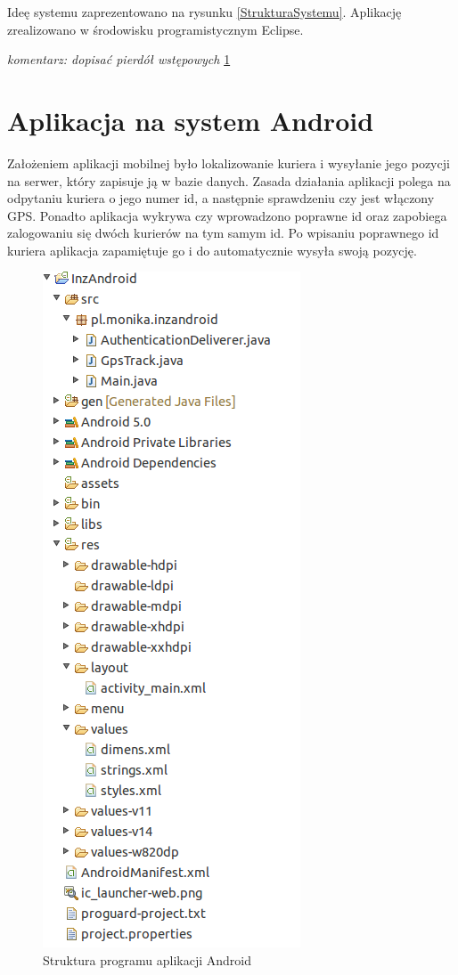 \documentclass[eng,printmode,oneside]{mgr}
\begin{document}
Ideę systemu zaprezentowano na rysunku \ref{StrukturaSystemu}.
Aplikację zrealizowano w środowisku programistycznym Eclipse.

\emph{\color{komentarz} komentarz: dopisać pierdół wstępowych}
\ref{}

\newpage
\section{Aplikacja na system Android}

Założeniem aplikacji mobilnej było lokalizowanie kuriera i wysyłanie jego
pozycji na serwer, który zapisuje ją w bazie danych. Zasada działania aplikacji
polega na odpytaniu kuriera o jego numer id, a następnie sprawdzeniu czy jest
włączony GPS. Ponadto aplikacja wykrywa czy wprowadzono poprawne id oraz
zapobiega zalogowaniu się dwóch kurierów na tym samym id. Po wpisaniu poprawnego
id kuriera aplikacja zapamiętuje go i do automatycznie wysyła swoją pozycję.

\begin{figure}
\centering
\captionsetup{justification=centering,margin=0cm}
\begin{center}
\includegraphics[width=.4\textwidth]{struktura_android.png}
\end{center}
\caption{Struktura programu aplikacji Android}
\label{fig:androidStruktura}
\end{figure}
\end{document}
